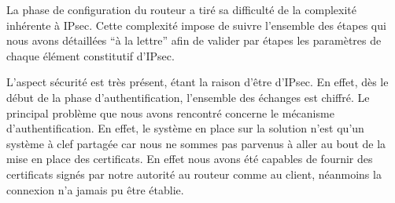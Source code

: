 La phase de configuration du routeur a tiré sa difficulté de la complexité inhérente à IPsec. Cette complexité impose de suivre l'ensemble des étapes qui nous avons détaillées ``à la lettre'' afin de valider par étapes les paramètres de chaque élément constitutif d'IPsec.

L'aspect sécurité est très présent, étant la raison d'être d'IPsec. En effet, dès le début de la phase d'authentification, l'ensemble des échanges est chiffré. Le principal problème que nous avons rencontré concerne le mécanisme d'authentification. En effet, le système en place sur la solution n'est qu'un système à clef partagée car nous ne sommes pas parvenus à aller au bout de la mise en place des certificats. En effet nous avons été capables de fournir des certificats signés par notre autorité au routeur comme au client, néanmoins la connexion n'a jamais pu être établie.
